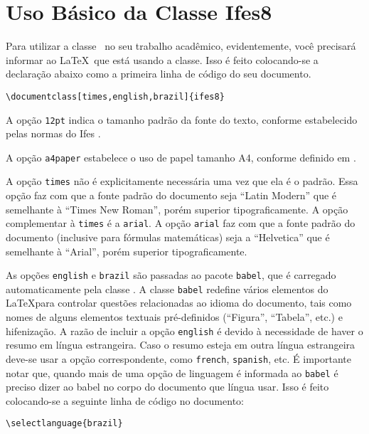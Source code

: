 \documentclass[times,english,brazil,oneside,section=TITLE]{ifes8}
\begin{document}
\section{Uso Básico da Classe Ifes8}
\label{sec:uso-basico}

Para utilizar a classe \ifestex\ no seu trabalho acadêmico,
evidentemente, você precisará informar ao \LaTeX\ que está usando a
classe. Isso é feito colocando-se a declaração abaixo como a primeira
linha de código do seu documento.\vspace{\baselineskip}

\begin{lstlisting}[language={[LaTeX]TeX}]
  \documentclass[times,english,brazil]{ifes8}  
\end{lstlisting}

A opção \texttt{12pt} indica o tamanho padrão da fonte do texto,
conforme estabelecido pelas normas do Ifes \cite[pp.~20]{Ifes2017}.

A opção \texttt{a4paper} estabelece o uso de papel tamanho A4,
conforme definido em \cite[pp.~19]{Ifes2017}.

A opção \texttt{times} não é explicitamente necessária uma vez que ela
é o padrão. Essa opção faz com que a fonte padrão do documento seja
“Latin Modern” que é semelhante à “Times New Roman”, porém superior
tipograficamente. A opção complementar à \texttt{times} é a
\texttt{arial}. A opção \texttt{arial} faz com que a fonte padrão do
documento (inclusive para fórmulas matemáticas) seja a “Helvetica” que
é semelhante à “Arial”, porém superior tipograficamente.

As opções \texttt{english} e \texttt{brazil} são passadas ao pacote
\texttt{babel}, que é carregado automaticamente pela classe \abnTeX.
A classe \texttt{babel} redefine vários elementos do \LaTeX para
controlar questões relacionadas ao idioma do documento, tais como
nomes de alguns elementos textuais pré-definidos (``Figura'',
``Tabela'', etc.) e hifenização. A razão de incluir a opção
\texttt{english} é devido à necessidade de haver o resumo em língua
estrangeira. Caso o resumo esteja em outra língua estrangeira deve-se
usar a opção correspondente, como \texttt{french}, \texttt{spanish},
etc. É importante notar que, quando mais de uma opção de linguagem é
informada ao \texttt{babel} é preciso dizer ao babel no corpo do
documento que língua usar. Isso é feito colocando-se a seguinte linha
de código no documento:\vspace{\baselineskip}

\begin{lstlisting}[language={[LaTeX]TeX}]
  \selectlanguage{brazil}  
\end{lstlisting}
\end{document}
